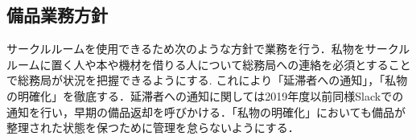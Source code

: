 \subsection*{備品業務方針}

サークルルームを使用できるため次のような方針で業務を行う．私物をサークルルームに置く人や本や機材を借りる人について総務局への連絡を必須とすることで総務局が状況を把握できるようにする. これにより「延滞者への通知」，「私物の明確化」を徹底する．延滞者への通知に関しては2019年度以前同様Slackでの通知を行い，早期の備品返却を呼びかける．「私物の明確化」においても備品が整理された状態を保つために管理を怠らないようにする．

